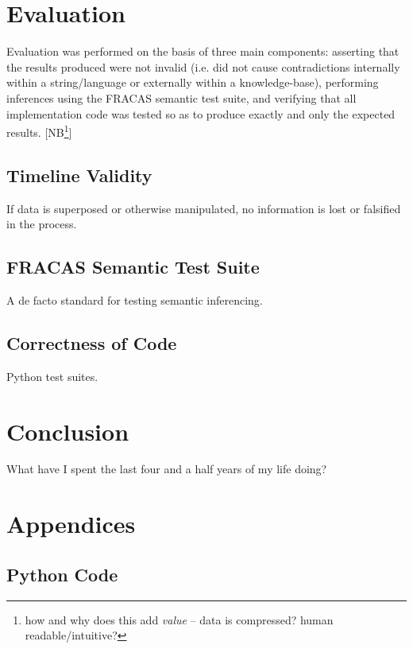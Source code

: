 \documentclass[a4paper,12pt,leqno]{article}
\newcommand{\selfnote}[1]{{\color{red}[NB\footnote{{\color{red}#1}}]}}
\newcommand{\nb}{\selfnote}
\begin{document}
\newpage
\section{Evaluation}\label{sec:evaluation}
Evaluation was performed on the basis of three main components: asserting that the results produced were not invalid (i.e. did not cause contradictions internally within a string/language or externally within a knowledge-base), performing inferences using the FRACAS semantic test suite, and verifying that all implementation code was tested so as to produce exactly and only the expected results. \nb{how and why does this add \textit{value} -- data is compressed? human readable/intuitive?}
\subsection{Timeline Validity}\label{sub:validity}
If data is superposed or otherwise manipulated, no information is lost or falsified in the process.
\subsection{FRACAS Semantic Test Suite}\label{sub:fracas}
A de facto standard for testing semantic inferencing.
\subsection{Correctness of Code}\label{sub:correct}
Python test suites.
\newpage
\section{Conclusion}\label{sec:conclusion}
What have I spent the last four and a half years of my life doing?

\newpage
\pagestyle{empty}
\onehalfspacing


\newpage
\section*{Appendices}
\subsection*{Python Code}
\end{document}
